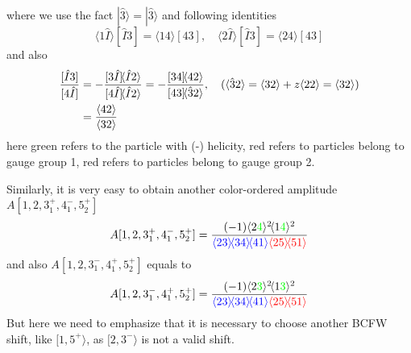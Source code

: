 \documentclass[12pt]{article}
\numberwithin{equation}{section}
\newcommand{\mdavg}[2]{\langle #1 \rangle\!\langle #2 \rangle}
\newcommand{\avg}[1]{\langle #1 \rangle}
\newcommand{\cbrak}[2]{\avg{#1}\![#2]}
\newcommand{\acbrak}[2]{[#1]\!\avg{#2}}
\begin{document}
where we use the fact $|\hat{3}\rangle=|\hat{3}\rangle$ and following identities
\begin{equation}
    \cbrak{1\hat{I}}{\hat{I}3}=\cbrak{14}{43},\quad \cbrak{2\hat{I}}{\hat{I}3}=\cbrak{24}{43}
\end{equation}
and also
\begin{align}
    \frac{[\hat{I}3]}{[4\hat{I}]}&=-\frac{\acbrak{3\hat{I}}{\hat{I}2}}{\acbrak{4\hat{I}}{\hat{I}2}}=-\frac{\acbrak{34}{42}}{\acbrak{43}{\hat{3}2}},\quad(\avg{\hat{3}2}=\avg{32}+z\avg{22}=\avg{32})\notag\\
    &=\frac{\avg{42}}{\avg{32}}
\end{align}
here green refers to the particle with (-) helicity, red refers to particles belong to gauge group 1, red refers to particles belong to gauge group 2.
\par
Similarly, it is very easy to obtain another color-ordered amplitude $A[1,2,3_1^+,4_1^-,5_2^+]$
\begin{align}
    A[1,2,3_1^+,4_1^-,5_2^+]=
    \frac{(-1)\avg{2\textcolor{green}{4}}^2\!\avg{1\textcolor{green}{4}}^2}{\textcolor{blue}{\mdavg{23}{34}\!\avg{41}}\textcolor{red}{\mdavg{25}{51}}}
\end{align}
and also $A[1,2,3_1^-,4_1^+,5_2^+]$ equals to
\begin{equation}
    A[1,2,3_1^-,4_1^+,5_2^+]=
    \frac{(-1)\avg{2\textcolor{green}{3}}^2\!\avg{1\textcolor{green}{3}}^2}{\textcolor{blue}{\mdavg{23}{34}\!\avg{41}}\textcolor{red}{\mdavg{25}{51}}}
\end{equation}
But here we need to emphasize that it is necessary to choose another BCFW shift, like $[1,5^+ \rangle$, as $[2,3^- \rangle$ is not a valid shift. 
\end{document}
